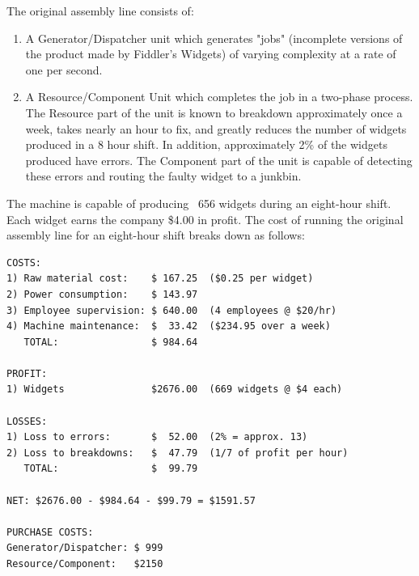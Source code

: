 \documentclass[10pt]{article}
\begin{document}
The original assembly line consists of:

\begin{enumerate}
\item A Generator/Dispatcher unit which generates "jobs" (incomplete
versions of the product made by Fiddler's Widgets) of varying
complexity at a rate of one per second. 
\item A Resource/Component Unit which completes the job in a two-phase
process.  The Resource part of the unit is known to breakdown
approximately once a week, takes nearly an hour to fix, and greatly
reduces the number of widgets produced in a 8 hour shift.  In
addition, approximately 2\% of the widgets produced have errors. The
Component part of the unit is capable of detecting these errors and
routing the faulty widget to a junkbin.
\end{enumerate}

The machine is capable of producing ~656 widgets during an eight-hour
shift. Each widget earns the company \$4.00 in profit.  The cost of running the
original assembly line for an eight-hour shift breaks down as follows:

\begin{verbatim}
COSTS:
1) Raw material cost:    $ 167.25  ($0.25 per widget)  
2) Power consumption:    $ 143.97
3) Employee supervision: $ 640.00  (4 employees @ $20/hr)
4) Machine maintenance:  $  33.42  ($234.95 over a week)
   TOTAL:                $ 984.64

PROFIT:
1) Widgets               $2676.00  (669 widgets @ $4 each)

LOSSES:
1) Loss to errors:       $  52.00  (2% = approx. 13)
2) Loss to breakdowns:   $  47.79  (1/7 of profit per hour)
   TOTAL:                $  99.79

NET: $2676.00 - $984.64 - $99.79 = $1591.57

PURCHASE COSTS:
Generator/Dispatcher: $ 999
Resource/Component:   $2150
\end{verbatim}
\end{document}
